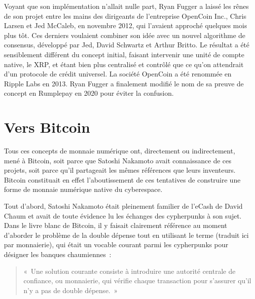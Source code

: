 Voyant que son implémentation n'allait nulle part, Ryan Fugger a laissé les rênes de son projet entre les mains des dirigeants de l'entreprise OpenCoin Inc., Chris Larsen et Jed McCaleb, en novembre 2012, qui l'avaient approché quelques mois plus tôt. Ces derniers voulaient combiner son idée avec un nouvel algorithme de consensus, développé par Jed, David Schwartz et Arthur Britto. Le résultat a été sensiblement différent du concept initial, faisant intervenir une unité de compte native, le XRP, et étant bien plus centralisé et contrôlé que ce qu'on attendrait d'un protocole de crédit universel. La société OpenCoin a été renommée en Ripple Labs en 2013. Ryan Fugger a finalement modifié le nom de sa preuve de concept en Rumplepay en 2020 pour éviter la confusion.

\section*{Vers Bitcoin}

Tous ces concepts de monnaie numérique ont, directement ou indirectement, mené à Bitcoin, soit parce que Satoshi Nakamoto avait connaissance de ces projets, soit parce qu'il partageait les mêmes références que leurs inventeurs. Bitcoin constituait en effet l'aboutissement de ces tentatives de construire une forme de monnaie numérique native du cyberespace.

Tout d'abord, Satoshi Nakamoto était pleinement familier de l'eCash de David Chaum et avait de toute évidence lu les échanges des cypherpunks à son sujet. Dans le livre blanc de Bitcoin, il y faisait clairement référence au moment d'aborder le problème de la double dépense tout en utilisant le terme  (traduit ici par monnaierie), qui était un vocable courant parmi les cypherpunks pour désigner les banques chaumiennes~:

\begin{quote}
«~Une solution courante consiste à introduire une autorité centrale de confiance, ou monnaierie, qui vérifie chaque transaction pour s'assurer qu'il n'y a pas de double dépense.~»
\end{quote}

